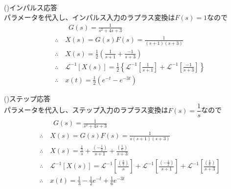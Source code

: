 \documentclass[a4paper,12pt]{article}
\begin{document}
\begin{tcolorbox}[title={6. (2)\(m=1,d=4,k_1=1,k_2=2\)とし、インパルス応答、ステップ応答をそれぞれ\\
\indent \quad 求めよ。}]

    (\uppercase\expandafter{})インパルス応答 \\
    パラメータを代入し、インパルス入力のラプラス変換は\(F(s)=1\)なので
    \vspace{-2mm}
    \begin{align*}
        &\qquad G(s) = \frac{1}{s^2 + 4 s + 3 } \\
        &\therefore \quad X(s) = G(s) F(s) = \frac{1}{(s+1)(s+3)} \\
        &\therefore \quad X(s) = \frac{1}{2} \left( \frac{1}{s+1} + \frac{-1}{s+3} \right)\\
        &\therefore \quad \mathcal{L}^{-1} \left[ X(s)\right] 
        =\frac{1}{2} \left\{ \mathcal{L}^{-1} \left[\frac{1}{s+1}\right] 
        + \mathcal{L}^{-1} \left[\frac{-1}{s+3}\right] \right\}\\
        &\therefore \quad x(t) = \frac{1}{2}\left(e^{-t} - e^{-3t} \right)
    \end{align*}

    (\uppercase\expandafter{})ステップ応答 \\
    パラメータを代入し、ステップ入力のラプラス変換は\(F(s)=\dfrac{1}{s}\)なので
    \vspace{-2mm}
    \begin{align*}
        &\qquad G(s) = \frac{1}{s^2 + 4 s + 3 } \\
        &\therefore \quad X(s) = G(s) F(s) = \frac{1}{s(s+1)(s+3)} \\
        &\therefore \quad X(s) = \frac{\frac{1}{3}}{s} 
        + \frac{\left(-\frac{1}{2}\right)}{s+1} 
        + \frac{\left(\frac{1}{6}\right)}{s+3} \\
        &\therefore \quad \mathcal{L}^{-1} \left[ X(s)\right] 
        = \mathcal{L}^{-1} \left[\frac{\left(\frac{1}{3}\right)}{s}\right] 
        + \mathcal{L}^{-1} \left[\frac{\left(-\frac{1}{2}\right)}{s+1}\right]
        + \mathcal{L}^{-1} \left[\frac{\left(\frac{1}{6}\right)}{s+3}\right] \\
        &\therefore \quad x(t) = \frac{1}{3} - \frac{1}{2}e^{-t} +\frac{1}{6} e^{-3t}
    \end{align*}

\end{tcolorbox}
\end{document}
